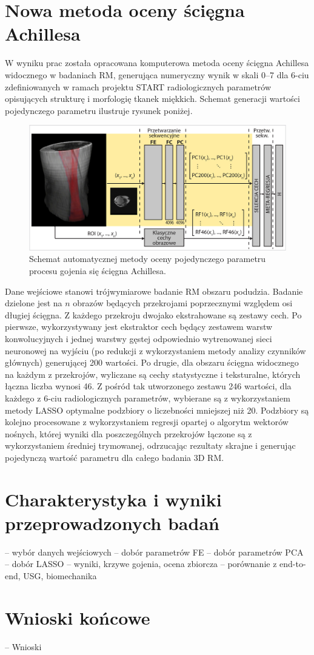 \chapter{Nowa metoda oceny ścięgna Achillesa}

W wyniku prac została opracowana komputerowa metoda oceny ścięgna Achillesa widocznego w badaniach RM, generująca numeryczny wynik w skali 0--7 dla 6-ciu zdefiniowanych w ramach projektu START radiologicznych parametrów opisujących strukturę i morfologię tkanek miękkich. Schemat generacji wartości pojedynczego parametru ilustruje rysunek poniżej. 
\begin{figure}[h!]
	\includegraphics[width=\textwidth]{figures/net.jpg}
	\caption{Schemat automatycznej metody oceny pojedynczego parametru procesu gojenia się ścięgna Achillesa.} \label{fig:net}
\end{figure}

Dane wejściowe stanowi trójwymiarowe badanie RM obszaru podudzia. Badanie dzielone jest na $n$ obrazów będących przekrojami poprzecznymi względem osi długiej ścięgna. Z każdego przekroju dwojako ekstrahowane są zestawy cech. Po pierwsze, wykorzystywany jest ekstraktor cech będący zestawem warstw konwolucyjnych i jednej warstwy gęstej odpowiednio wytrenowanej sieci neuronowej na wyjściu (po redukcji z wykorzystaniem metody analizy czynników głównych) generującej 200 wartości. Po drugie, dla obszaru ścięgna widocznego na każdym z przekrojów, wyliczane są cechy statystyczne i teksturalne, których łączna liczba wynosi 46. Z pośród tak utworzonego zestawu 246 wartości, dla każdego z 6-ciu radiologicznych parametrów, wybierane są z wykorzystaniem metody LASSO optymalne podzbiory o liczebności mniejszej niż 20. Podzbiory są kolejno procesowane z wykorzystaniem regresji opartej o algorytm wektorów nośnych, której wyniki dla poszczególnych przekrojów łączone są z wykorzystaniem średniej trymowanej, odrzucając rezultaty skrajne i generując pojedynczą wartość parametru dla całego badania 3D RM.   

\chapter{Charakterystyka i wyniki przeprowadzonych badań}

-- wybór danych wejściowych
-- dobór parametrów FE
-- dobór parametrów PCA
-- dobór LASSO
-- wyniki, krzywe gojenia, ocena zbiorcza
-- porównanie z end-to-end, USG, biomechanika

\chapter{Wnioski końcowe}

-- Wnioski
